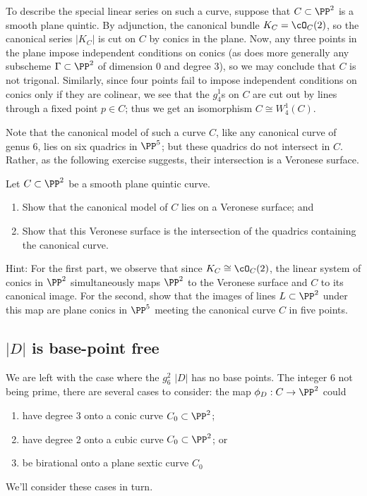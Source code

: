 To describe the special linear series on such a curve, suppose that $C \subset \PP^2$ is a smooth plane quintic. By adjunction, the canonical bundle $K_C = \cO_C(2)$, so the canonical series $|K_C|$ is cut on $C$ by conics in the plane. Now, any three points in the plane impose independent conditions on conics (as does more generally any subscheme $\Gamma \subset \PP^2$ of dimension 0 and degree 3), so we may conclude that $C$ is not trigonal. Similarly, since four points fail to impose independent conditions on conics only if they are colinear, we see that the $g^1_4$s on $C$ are cut out by lines through a fixed point $p \in C$; thus we get an isomorphism $C \cong W^1_4(C)$.

Note that the canonical model of such a curve $C$, like any canonical curve of genus 6, lies on six quadrics in $\PP^5$; but these quadrics do not intersect in $C$. Rather, as the following exercise suggests, their intersection is a Veronese surface.

\begin{exercise}
Let $C \subset \PP^2$ be a smooth plane quintic curve.
\begin{enumerate}
\item Show that the canonical model of $C$ lies on a Veronese surface; and
\item Show that this Veronese surface is the intersection of the quadrics containing the canonical curve.
\end{enumerate}
\end{exercise}

Hint: For the first part, we observe that since $K_C \cong \cO_C(2)$, the linear system of conics in $\PP^2$ simultaneously maps $\PP^2$ to the Veronese surface and $C$ to its canonical image. For the second, show that the images of lines $L \subset \PP^2$ under this map are plane conics in $\PP^5$ meeting the canonical curve $C$ in five points.

\subsection{$|D|$ is base-point free}

We are left with the case where the $g^2_6$ $|D|$ has no base points. The integer 6 not being prime, there are several cases to consider: the map $\phi_D : C \to \PP^2$ could
\begin{enumerate}
\item have degree 3 onto a conic curve $C_0 \subset \PP^2$;
\item have degree 2 onto a cubic curve $C_0 \subset \PP^2$; or
\item be birational onto a plane sextic curve $C_0$
\end{enumerate}
We'll consider these cases in turn.

